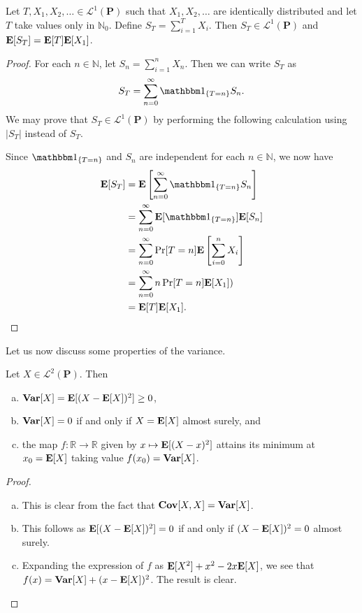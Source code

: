 \begin{theorem}
\label{walds identity randvarsum expec}
    Let $T,X_1,X_2,\ldots\in\mathcal{L}^1(\textbf{P})$ such that $X_1,X_2,\ldots$ are identically distributed and let $T$ take values only in $\mathbb{N}_0$. Define $S_T=\sum_{i=1}^T X_i$. Then $S_T\in\mathcal{L}^1(\textbf{P})$ and $\textbf{E}[S_T]=\textbf{E}[T]\textbf{E}[X_1]$.
\end{theorem}
\begin{proof}
    For each $n\in\mathbb{N}$, let $S_n=\sum_{i=1}^n X_n$. Then we can write $S_T$ as
    $$S_T=\sum_{n=0}^\infty \indic_{\{T=n\}} S_n.$$
    We may prove that $S_T\in\mathcal{L}^1(\textbf{P})$ by performing the following calculation using $|S_T|$ instead of $S_T$.
    
    Since $\indic_{\{T=n\}}$ and $S_n$ are independent for each $n\in\mathbb{N}$, we now have
    \begin{align*}
        \expec[S_T] &= \expec\left[\sum_{n=0}^\infty \indic_{\{T=n\}} S_n\right] \\
        &= \sum_{n=0}^\infty \expec[\indic_{\{T=n\}}]\expec[S_n] \\
        &= \sum_{n=0}^\infty \Pr[T=n] \expec\left[\sum_{i=0}^n X_i\right] \\
        &= \sum_{n=0}^\infty n \Pr[T=n] \expec[X_1]) \\
        &= \expec[T]\expec[X_1].
    \end{align*}
\end{proof}

Let us now discuss some properties of the variance.

\begin{theorem}
\label{properties of variance}
    Let $X\in\mathcal{L}^2(\textbf{P})$. Then
    \begin{enumerate}[(a)]
        \item $\operatorname{\textbf{Var}}[X]=\textbf{E}[(X-\textbf{E}[X])^2] \geq 0$,
        \item $\operatorname{\textbf{Var}}[X]=0$ if and only if $X=\textbf{E}[X]$ almost surely, and
        \item the map $f:\mathbb{R}\to\mathbb{R}$ given by $x\mapsto \textbf{E}[(X-x)^2]$ attains its minimum at $x_0=\textbf{E}[X]$ taking value $f(x_0)=\operatorname{\textbf{Var}}[X]$.
    \end{enumerate}
\end{theorem}
\begin{proof}
    ~
    \begin{enumerate}[(a)]
        \item This is clear from the fact that $\operatorname{\textbf{Cov}}[X,X]=\operatorname{\textbf{Var}}[X]$.
        \item This follows as $\textbf{E}[(X-\textbf{E}[X])^2]=0$ if and only if $(X-\textbf{E}[X])^2=0$ almost surely.
        \item Expanding the expression of $f$ as $\textbf{E}[X^2]+x^2-2x\textbf{E}[X]$, we see that $f(x)=\operatorname{\textbf{Var}}[X]+(x-\textbf{E}[X])^2$. The result is clear.
    \end{enumerate}
\end{proof}

